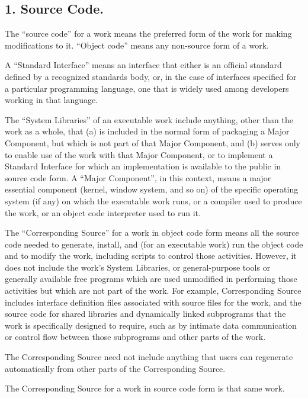 \subsection{1. Source Code.}
The “source code” for a work means the preferred form of the work for making modifications to it. “Object code” means any non-source form of a work.\par
A “Standard Interface” means an interface that either is an official standard defined by a recognized standards body, or, in the case of interfaces specified for a particular programming language, one that is widely used among developers working in that language.\par
The “System Libraries” of an executable work include anything, other than the work as a whole, that (a) is included in the normal form of packaging a Major Component, but which is not part of that Major Component, and (b) serves only to enable use of the work with that Major Component, or to implement a Standard Interface for which an implementation is available to the public in source code form. A “Major Component”, in this context, means a major essential component (kernel, window system, and so on) of the specific operating system (if any) on which the executable work runs, or a compiler used to produce the work, or an object code interpreter used to run it.\par
The “Corresponding Source” for a work in object code form means all the source code needed to generate, install, and (for an executable work) run the object code and to modify the work, including scripts to control those activities. However, it does not include the work's System Libraries, or general-purpose tools or generally available free programs which are used unmodified in performing those activities but which are not part of the work. For example, Corresponding Source includes interface definition files associated with source files for the work, and the source code for shared libraries and dynamically linked subprograms that the work is specifically designed to require, such as by intimate data communication or control flow between those subprograms and other parts of the work.\par
The Corresponding Source need not include anything that users can regenerate automatically from other parts of the Corresponding Source.\par
The Corresponding Source for a work in source code form is that same work.

